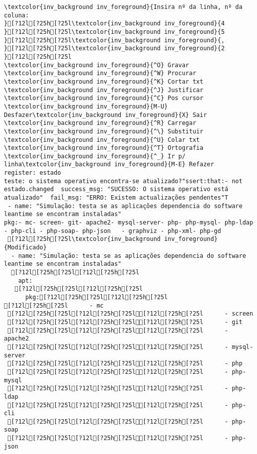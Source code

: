 \documentclass{scrartcl}
\begin{document}
\begin{Verbatim}
\textcolor{inv_background inv_foreground}{Insira nº da linha, nº da coluna:                                                                       }[?12l[?25h[?25l\textcolor{inv_background inv_foreground}{4
}[?12l[?25h[?25l\textcolor{inv_background inv_foreground}{5
}[?12l[?25h[?25l\textcolor{inv_background inv_foreground}{,
}[?12l[?25h[?25l\textcolor{inv_background inv_foreground}{2
}[?12l[?25h[?25l
\textcolor{inv_background inv_foreground}{^O} Gravar     \textcolor{inv_background inv_foreground}{^W} Procurar   \textcolor{inv_background inv_foreground}{^K} Cortar txt \textcolor{inv_background inv_foreground}{^J} Justificar \textcolor{inv_background inv_foreground}{^C} Pos cursor \textcolor{inv_background inv_foreground}{M-U} Desfazer\textcolor{inv_background inv_foreground}{X} Sair       \textcolor{inv_background inv_foreground}{^R} Carregar   \textcolor{inv_background inv_foreground}{^\} Substituir \textcolor{inv_background inv_foreground}{^U} Colar txt  \textcolor{inv_background inv_foreground}{^T} Ortografia \textcolor{inv_background inv_foreground}{^_} Ir p/ linha\textcolor{inv_background inv_foreground}{M-E} Refazer
register: estado
teste: o sistema operativo encontra-se atualizado?"ssert:that:- not estado.changed  success_msg: "SUCESSO: O sistema operativo está atualizado"  fail_msg: "ERRO: Existem actualizações pendentes"T
 - name: "Simulação: testa se as aplicações dependencia do software leantime se encontram instaladas"
pkg:- mc- screen- git- apache2- mysql-server- php- php-mysql- php-ldap - php-cli - php-soap- php-json   - graphviz - php-xml- php-gd
 [?12l[?25h[?25l\textcolor{inv_background inv_foreground}{Modificado}
  - name: "Simulação: testa se as aplicações dependencia do software leantime se encontram instaladas"
  [?12l[?25h[?25l[?12l[?25h[?25l
    apt:
   [?12l[?25h[?25l[?12l[?25h[?25l
      pkg:[?12l[?25h[?25l[?12l[?25h[?25l
[?12l[?25h[?25l      - mc
 [?12l[?25h[?25l[?12l[?25h[?25l[?12l[?25h[?25l      - screen
 [?12l[?25h[?25l[?12l[?25h[?25l[?12l[?25h[?25l      - git
 [?12l[?25h[?25l[?12l[?25h[?25l[?12l[?25h[?25l      - apache2
 [?12l[?25h[?25l[?12l[?25h[?25l[?12l[?25h[?25l      - mysql-server
 [?12l[?25h[?25l[?12l[?25h[?25l[?12l[?25h[?25l      - php
 [?12l[?25h[?25l[?12l[?25h[?25l[?12l[?25h[?25l      - php-mysql
 [?12l[?25h[?25l[?12l[?25h[?25l[?12l[?25h[?25l      - php-ldap
 [?12l[?25h[?25l[?12l[?25h[?25l[?12l[?25h[?25l      - php-cli
 [?12l[?25h[?25l[?12l[?25h[?25l[?12l[?25h[?25l      - php-soap
 [?12l[?25h[?25l[?12l[?25h[?25l[?12l[?25h[?25l      - php-json

\end{Verbatim}
\end{document}
